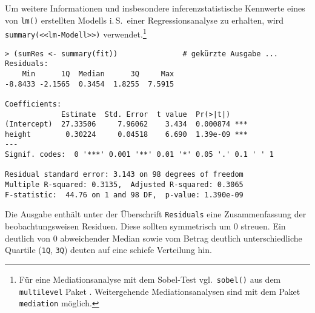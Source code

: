 Um weitere Informationen und insbesondere inferenzstatistische Kennwerte eines von \lstinline!lm()! erstellten Modells i.\,S.\ einer Regressionsanalyse zu erhalten, wird \lstinline!summary(<<lm-Modell>>)! verwendet.\footnote{Für eine Mediationsanalyse mit dem Sobel-Test vgl.\ \lstinline!sobel()! aus dem \lstinline!multilevel! Paket \cite{Bliese2006}. Weitergehende Mediationsanalysen sind mit dem Paket \lstinline!mediation! \cite{Tingley2011} möglich.}
\begin{lstlisting}
> (sumRes <- summary(fit))               # gekürzte Ausgabe ...
Residuals:
    Min      1Q  Median      3Q     Max
-8.8433 -2.1565  0.3454  1.8255  7.5915

Coefficients:
             Estimate  Std. Error  t value  Pr(>|t|)
(Intercept)  27.33506     7.96062    3.434  0.000874 ***
height        0.30224     0.04518    6.690  1.39e-09 ***
---
Signif. codes:  0 '***' 0.001 '**' 0.01 '*' 0.05 '.' 0.1 ' ' 1

Residual standard error: 3.143 on 98 degrees of freedom
Multiple R-squared: 0.3135,  Adjusted R-squared: 0.3065
F-statistic:  44.76 on 1 and 98 DF,  p-value: 1.390e-09
\end{lstlisting}

Die Ausgabe enthält unter der Überschrift \lstinline!Residuals! eine Zusammenfassung der beobachtungsweisen Residuen. Diese sollten symmetrisch um 0 streuen. Ein deutlich von 0 abweichender Median sowie vom Betrag deutlich unterschiedliche Quartile (\lstinline!1Q!, \lstinline!3Q!) deuten auf eine schiefe Verteilung hin.

